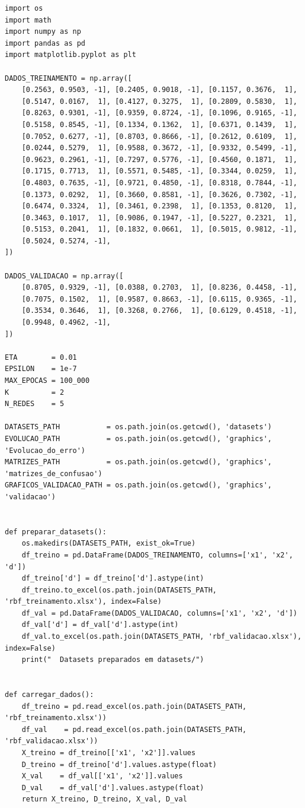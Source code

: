 \documentclass[article, 12pt, oneside, a4paper, section = TITLE, brazil]{abntex2}
\begin{document}
\begin{lstlisting}
import os
import math
import numpy as np
import pandas as pd
import matplotlib.pyplot as plt

DADOS_TREINAMENTO = np.array([
    [0.2563, 0.9503, -1], [0.2405, 0.9018, -1], [0.1157, 0.3676,  1],
    [0.5147, 0.0167,  1], [0.4127, 0.3275,  1], [0.2809, 0.5830,  1],
    [0.8263, 0.9301, -1], [0.9359, 0.8724, -1], [0.1096, 0.9165, -1],
    [0.5158, 0.8545, -1], [0.1334, 0.1362,  1], [0.6371, 0.1439,  1],
    [0.7052, 0.6277, -1], [0.8703, 0.8666, -1], [0.2612, 0.6109,  1],
    [0.0244, 0.5279,  1], [0.9588, 0.3672, -1], [0.9332, 0.5499, -1],
    [0.9623, 0.2961, -1], [0.7297, 0.5776, -1], [0.4560, 0.1871,  1],
    [0.1715, 0.7713,  1], [0.5571, 0.5485, -1], [0.3344, 0.0259,  1],
    [0.4803, 0.7635, -1], [0.9721, 0.4850, -1], [0.8318, 0.7844, -1],
    [0.1373, 0.0292,  1], [0.3660, 0.8581, -1], [0.3626, 0.7302, -1],
    [0.6474, 0.3324,  1], [0.3461, 0.2398,  1], [0.1353, 0.8120,  1],
    [0.3463, 0.1017,  1], [0.9086, 0.1947, -1], [0.5227, 0.2321,  1],
    [0.5153, 0.2041,  1], [0.1832, 0.0661,  1], [0.5015, 0.9812, -1],
    [0.5024, 0.5274, -1],
])

DADOS_VALIDACAO = np.array([
    [0.8705, 0.9329, -1], [0.0388, 0.2703,  1], [0.8236, 0.4458, -1],
    [0.7075, 0.1502,  1], [0.9587, 0.8663, -1], [0.6115, 0.9365, -1],
    [0.3534, 0.3646,  1], [0.3268, 0.2766,  1], [0.6129, 0.4518, -1],
    [0.9948, 0.4962, -1],
])

ETA        = 0.01
EPSILON    = 1e-7
MAX_EPOCAS = 100_000
K          = 2
N_REDES    = 5

DATASETS_PATH           = os.path.join(os.getcwd(), 'datasets')
EVOLUCAO_PATH           = os.path.join(os.getcwd(), 'graphics', 'Evolucao_do_erro')
MATRIZES_PATH           = os.path.join(os.getcwd(), 'graphics', 'matrizes_de_confusao')
GRAFICOS_VALIDACAO_PATH = os.path.join(os.getcwd(), 'graphics', 'validacao')


def preparar_datasets():
    os.makedirs(DATASETS_PATH, exist_ok=True)
    df_treino = pd.DataFrame(DADOS_TREINAMENTO, columns=['x1', 'x2', 'd'])
    df_treino['d'] = df_treino['d'].astype(int)
    df_treino.to_excel(os.path.join(DATASETS_PATH, 'rbf_treinamento.xlsx'), index=False)
    df_val = pd.DataFrame(DADOS_VALIDACAO, columns=['x1', 'x2', 'd'])
    df_val['d'] = df_val['d'].astype(int)
    df_val.to_excel(os.path.join(DATASETS_PATH, 'rbf_validacao.xlsx'), index=False)
    print("  Datasets preparados em datasets/")


def carregar_dados():
    df_treino = pd.read_excel(os.path.join(DATASETS_PATH, 'rbf_treinamento.xlsx'))
    df_val    = pd.read_excel(os.path.join(DATASETS_PATH, 'rbf_validacao.xlsx'))
    X_treino = df_treino[['x1', 'x2']].values
    D_treino = df_treino['d'].values.astype(float)
    X_val    = df_val[['x1', 'x2']].values
    D_val    = df_val['d'].values.astype(float)
    return X_treino, D_treino, X_val, D_val



\end{lstlisting}
\end{document}
